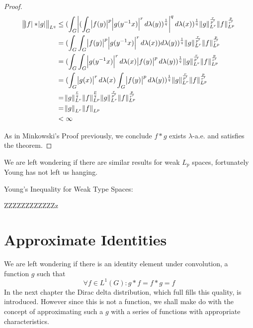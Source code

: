 \begin{proof}
\begin{align*}
\norm{\abs{f} \ast \abs{g}}_{L^q} &\leq (\int_G \abs{(\int_G \abs{f(y)}^p\abs{g(y^{-1}x)}^r d\lambda(y) )^\frac{1}{q}}^q d\lambda(x))^\frac{1}{q} \norm{g}^\frac{r}{p'}_{L^r} \norm{f}^\frac{p}{r'}_{L^p} \\
&= (\int_G\int_G \abs{f(y)}^p\abs{g(y^{-1}x)}^r d\lambda(x)) d\lambda(y) )^\frac{1}{q} \norm{g}^\frac{r}{p'}_{L^r} \norm{f}^\frac{p}{r'}_{L^p} \\
&= (\int_G\int_G \abs{g(y^{-1}x)}^r d\lambda(x) \abs{f(y)}^p d\lambda(y)  )^\frac{1}{q} \norm{g}^\frac{r}{p'}_{L^r} \norm{f}^\frac{p}{r'}_{L^p} \\
&= (\int_G \abs{g(x)}^r d\lambda(x) \int_G \abs{f(y)}^p d\lambda(y)  )^\frac{1}{q} \norm{g}^\frac{r}{p'}_{L^r} \norm{f}^\frac{p}{r'}_{L^p} \\
&= \norm{g}^\frac{r}{q}_{L^r} \norm{f}^\frac{p}{q}_{L^p} \norm{g}^\frac{r}{p'}_{L^r} \norm{f}^\frac{p}{r'}_{L^p} \\
&= \norm{g}_{L^r} \norm{f}_{L^p} \\
&< \infty
\end{align*}  

As in Minkowski's Proof previously, we conclude $f \ast g$ exists $\lambda$-a.e. and satisfies the theorem.
\end{proof}

We are left wondering if there are similar results for weak $L_p$ spaces, fortunately Young has not left us hanging.

\begin{theorem}
Young's Inequality for Weak Type Spaces:

ZZZZZZZZZZZZz


\end{theorem}

\section{Approximate Identities}

We are left wondering if there is an identity element under convolution, a function $g$ such that 
\begin{equation*}
\forall f \in L^1(G): g \ast f = f \ast g = f
\end{equation*}
In the next chapter the Dirac delta distribution, which full fills this quality, is introduced. However since this is not a function, we shall make do with the concept of approximating such a $g$ with a series of functions with appropriate characteristics.

